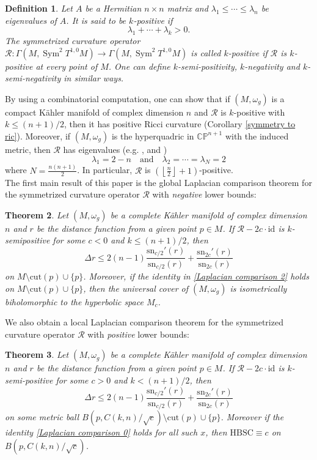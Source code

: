 \documentclass[12pt,reqno]{amsart}
\DeclareMathOperator*{\Sym}{Sym}
\theoremstyle{plain}
\newtheorem{thm}{Theorem}[section]
\newtheorem{defn}[thm]{Definition}
\theoremstyle{definition}
\newcommand{\btheorem}{\begin{thm}}
\newcommand{\etheorem}{\end{thm}}
\newcommand{\bdefinition}{\begin{defn}}
\newcommand{\edefinition}{\end{defn}}
\newcommand{\beq}{\begin{equation}}
\newcommand{\eeq}{\end{equation}}
\newcommand{\qtq}[1]{\quad\mbox{#1}\quad}
\renewcommand{\>}{\rightarrow}
\newcommand{\C}{{\mathbb C}}
\renewcommand{\P}{{\mathbb P}}
\numberwithin{equation}{section} %
\newcommand{\om}{\omega}
\renewcommand{\leq}{\leqslant}
\begin{document}
\bdefinition Let $A$ be a Hermitian $ n \times n $ matrix and $ \lambda_1 \leq \cdots \leq \lambda_n $ be eigenvalues of $ A $.   It  is said to be $ k $-positive if
\beq \lambda_1 + \cdots + \lambda_k > 0. \eeq
The symmetrized curvature operator $ \mathcal{R}: \Gamma(M,\Sym^2 T^{1,0}M) \> \Gamma(M,\Sym^2 T^{1,0}M) $ is called $ k $-positive if $ \mathcal{R} $ is $k $-positive at every point  of $ M $. One can define $k$-semi-positivity, $k$-negativity and $k$-semi-negativity in similar ways.
\edefinition
\noindent  By using a combinatorial computation, one can show that  if $(M,\omega_g)$ is a compact K\"ahler manifold of complex dimension $n$ and $\mathcal R$ is $k$-positive with $k\leq (n+1)/2$, then it has positive Ricci curvature (Corollary \ref{symmetry to ric}). Moreover, if $(M,\omega_g)$ is the hyperquadric in $\C\P^{n+1}$ with the induced metric, then  $ \mathcal{R} $ has eigenvalues   (e.g. \cite{CV60}, \cite{BNPSW25} and \cite{WY25+})  $$ \lambda_1 = 2-n  \qtq{and} \lambda_2 = \cdots = \lambda_{N} = 2 $$  where $ N = \frac{n(n+1)}{2} $. In particular, $\mathcal R$  is $\left(\left\lfloor \frac{n}{2}\right\rfloor+1\right) $-positive.\\


The first main result of this paper is  the global Laplacian
comparison theorem for the symmetrized curvature operator $
\mathcal{R} $ with \emph{negative} lower bounds:

\btheorem\label{thm symmetric curvature operator comparison}
Let $(M,\om_g)$ be a complete K\"ahler manifold of complex dimension $n$ and $r$ be  the distance function from a given point $p\in M$.
If $\mathcal{R}-2c\cdot\mathrm{id} $ is $k$-semipositive for some $c<0$ and $k\leq (n+1)/2$, then
\beq
\Delta r\leq2(n-1)\frac{\mathrm{sn}_{c/2}'(r)}{\mathrm{sn}_{c/2}(r)}+\frac{\mathrm{sn}_{2c}'(r)}{\mathrm{sn}_{2c}(r)}
\eeq
on $M\setminus \mathrm{cut}(p)\cup \{p\}$.
Moreover, if the identity in \eqref{Laplacian comparison 2} holds on $M\setminus\mathrm{cut}(p)\cup \{p\}$,
then the universal cover of $(M,\omega_g)$ is isometrically biholomorphic to the hyperbolic space $M_c$.
\etheorem



\noindent  We also obtain a local Laplacian comparison theorem for
the symmetrized curvature operator $ \mathcal{R} $ with
\emph{positive} lower bounds:

\btheorem \label{symmetric laplacian positive} Let $(M,\om_g)$ be a
complete K\"ahler manifold of complex dimension $n$ and $r$ be  the
distance function from a given point $p\in M$. If $\mathcal{R}-2c\cdot\mathrm{id} $
is $k$-semi-positive for some $c>0$ and $k< (n+1)/2$, then \beq
\Delta
r\leq2(n-1)\frac{\mathrm{sn}_{c/2}'(r)}{\mathrm{sn}_{c/2}(r)}+\frac{\mathrm{sn}_{2c}'(r)}{\mathrm{sn}_{2c}(r)}
\label{Laplacian comparison 0} \eeq on some metric ball
$B(p,C(k,n)/\sqrt{c})\setminus \mathrm{cut}(p)\cup \{p\}$. Moreover
if the identity \eqref{Laplacian comparison 0} holds for all such
$x$, then $\mathrm{HBSC}\equiv c$ on $B(p,C(k,n)/\sqrt{c})$.
\etheorem
\end{document}

